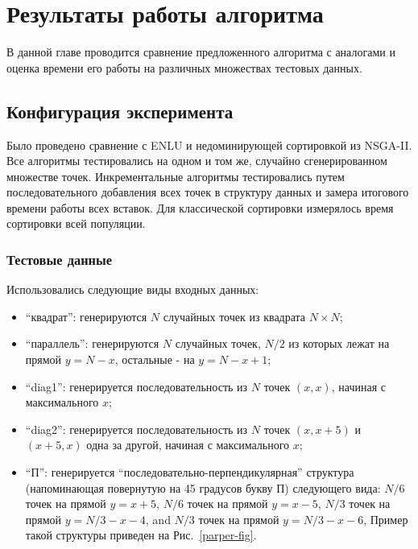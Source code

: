 \chapter{Результаты работы алгоритма}
\label{chapter3}

В данной главе проводится сравнение предложенного алгоритма с аналогами и оценка времени его работы 
на различных множествах тестовых данных.

\section{Конфигурация эксперимента}
\label{test_conf}
Было проведено сравнение с ENLU и недоминирующей сортировкой из NSGA-II.
Все алгоритмы тестировались на одном и том же, случайно сгенерированном множестве точек.
Инкрементальные алгоритмы тестировались путем последовательного добавления всех точек в структуру данных
и замера итогового времени работы всех вставок.
Для классической сортировки измерялось время сортировки всей популяции.

\subsection{Тестовые данные}
Использовались следующие виды входных данных:
\begin{itemize}
    \item ``квадрат'':   генерируются $N$ случайных точек из квадрата $N \times N$;
    \item ``параллель'': генерируются $N$ случайных точек, $N/2$ из которых лежат на прямой
                        $y = N - x$, остальные - на $y = N - x + 1$;
    \item ``diag1'':    генерируется последовательность из $N$ точек $(x, x)$,
                        начиная с максимального $x$;
    \item ``diag2'':    генерируется последовательность из $N$ точек $(x, x + 5)$ и $(x + 5, x)$ 
						одна за другой, начиная с максимального $x$;
    \item ``П'':   генерируется ``последовательно-перпендикулярная'' структура (напоминающая 
				   повернутую на 45 градусов букву \textsc{П}) следующего вида:
                        $N / 6$ точек на прямой $y = x + 5$,
                        $N / 6$ точек на прямой $y = x - 5$, 
                        $N / 3$ точек на прямой $y = N/3 - x - 4$, and
                        $N / 3$ точек на прямой $y = N/3 - x - 6$,
                   Пример такой структуры приведен на Рис.~\ref{parper-fig}.
\end{itemize}

